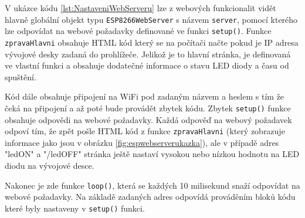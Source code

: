 V ukázce kódu \ref{lst:NastaveniWebServeru} lze z webových funkcionalit vidět hlavně globální objekt typu \texttt{ESP8266WebServer} s názvem \texttt{server}, pomocí kterého lze odpovídat na webové požadavky definované ve funkci \texttt{setup()}. Funkce \texttt{zpravaHlavni} obsahuje HTML kód který se na počítači načte pokud je IP adresa vývojové desky zadaná do prohlížeče. Jelikož je to hlavní stránka, je definovaná ve vlastní funkci a obsahuje dodatečné informace o stavu LED diody a času od spuštění.

Kód dále obsahuje připojení na WiFi pod zadaným názvem a heslem s tím že čeká na připojení a až poté bude provádět zbytek kódu. Zbytek \texttt{setup()} funkce obsahuje odpovědi na webové požadavky. Každá odpověď na webový požadavek odpoví tím, že zpět pošle HTML kód z funkce \texttt{zpravaHlavni} (který zobrazuje informace jako jsou v obrázku \ref{fig:espwebserverukazka}), ale v případě adres "ledON" a "/ledOFF" stránka ještě nastaví vysokou nebo nízkou hodnotu na LED diodu na vývojové desce.

Nakonec je zde funkce \texttt{loop()}, která se každých 10 milisekund snaží odpovídat na webové požadavky. Na základě zadaných adres odpovídá prováděním bloků kódu které byly nastaveny v \texttt{setup()} funkci.


